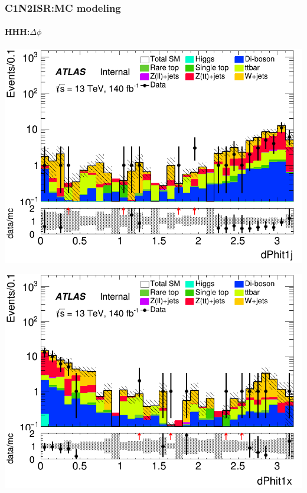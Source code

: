 \documentclass[usenames,dvipsnames]{beamer}
\begin{document}
\begin{frame}
\frametitle{C1N2ISR:MC modeling}
\framesubtitle{HHH:\quad $\Delta\phi$}
    \begin{minipage}{0.32\textwidth}
        \centering
        \includegraphics[width=\textwidth]{graphics/HHH_met/HHH_met_dPhit1j.png}
    \end{minipage}
    \hfill
    \begin{minipage}{0.32\textwidth}
        \centering
        \includegraphics[width=\textwidth]{graphics/HHH_met/HHH_met_dPhit1x.png}
    \end{minipage}
    \hfill
    \begin{minipage}{0.32\textwidth}
        \centering

\end{minipage}
\end{frame}
\end{document}
